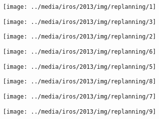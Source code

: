 \begin{figure*}[t!]
  \centering
  \begin{subfigure}[t]{0.4\textwidth}
       \texttt{[image: ../media/iros/2013/img/replanning/1]}
       \caption{}\label{fig:replan_1}
  \end{subfigure} 
  \quad
  \begin{subfigure}[t]{0.4\textwidth}
     \texttt{[image: ../media/iros/2013/img/replanning/3]}
     \caption{}\label{fig:replan_3}
  \end{subfigure}
  \vspace{2mm}
  \begin{subfigure}[t]{0.4\textwidth}
       \texttt{[image: ../media/iros/2013/img/replanning/2]}
       \caption{}\label{fig:replan_2}
  \end{subfigure} 
  \quad
  \begin{subfigure}[t]{0.4\textwidth}
     \texttt{[image: ../media/iros/2013/img/replanning/6]}
     \caption{}\label{fig:replan_6}
  \end{subfigure}
  \vspace{2mm}
  \begin{subfigure}[t]{0.4\textwidth}
       \texttt{[image: ../media/iros/2013/img/replanning/5]}
       \caption{}\label{fig:replan_5}
  \end{subfigure} 
  \quad
  \begin{subfigure}[t]{0.4\textwidth}
     \texttt{[image: ../media/iros/2013/img/replanning/8]}
     \caption{}\label{fig:replan_8}
   \end{subfigure}
   \vspace{2mm}  
   \begin{subfigure}[t]{0.4\textwidth}
       \texttt{[image: ../media/iros/2013/img/replanning/7]}
       \caption{}\label{fig:replan_7}
  \end{subfigure} 
  \quad
  \begin{subfigure}[t]{0.4\textwidth}
     \texttt{[image: ../media/iros/2013/img/replanning/9]}
     \caption{}\label{fig:replan_9}
  \end{subfigure}

\end{figure*}
